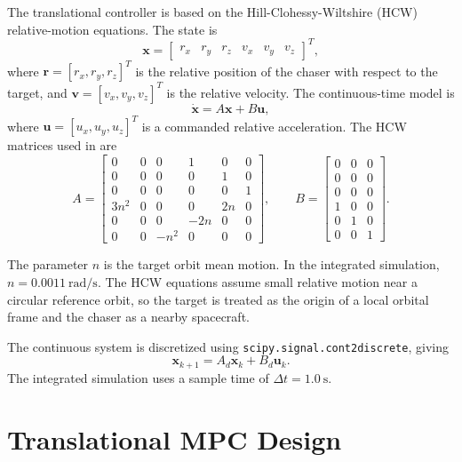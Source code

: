 \documentclass[11pt]{article}
\begin{document}
The translational controller is based on the Hill-Clohessy-Wiltshire (HCW) relative-motion equations. The state is
\begin{equation}
    \bm{x}
    =
    \begin{bmatrix}
    r_x & r_y & r_z & v_x & v_y & v_z
    \end{bmatrix}^{T},
\end{equation}
where \(\bm{r} = [r_x,r_y,r_z]^T\) is the relative position of the chaser with respect to the target, and \(\bm{v} = [v_x,v_y,v_z]^T\) is the relative velocity. The continuous-time model is
\begin{equation}
    \dot{\bm{x}} = A\bm{x} + B\bm{u},
\end{equation}
where \(\bm{u} = [u_x,u_y,u_z]^T\) is a commanded relative acceleration. The HCW matrices used in  are
\begin{equation}
A =
\begin{bmatrix}
0 & 0 & 0 & 1 & 0 & 0\\
0 & 0 & 0 & 0 & 1 & 0\\
0 & 0 & 0 & 0 & 0 & 1\\
3n^2 & 0 & 0 & 0 & 2n & 0\\
0 & 0 & 0 & -2n & 0 & 0\\
0 & 0 & -n^2 & 0 & 0 & 0
\end{bmatrix},
\qquad
B =
\begin{bmatrix}
0 & 0 & 0\\
0 & 0 & 0\\
0 & 0 & 0\\
1 & 0 & 0\\
0 & 1 & 0\\
0 & 0 & 1
\end{bmatrix}.
\end{equation}

The parameter \(n\) is the target orbit mean motion. In the integrated simulation, \(n = 0.0011~\mathrm{rad/s}\). The HCW equations assume small relative motion near a circular reference orbit, so the target is treated as the origin of a local orbital frame and the chaser as a nearby spacecraft.

The continuous system is discretized using \texttt{scipy.signal.cont2discrete}, giving
\begin{equation}
    \bm{x}_{k+1} = A_d \bm{x}_k + B_d \bm{u}_k.
\end{equation}
The integrated simulation uses a sample time of \(\Delta t = 1.0~\mathrm{s}\).

\section{Translational MPC Design}
\end{document}
